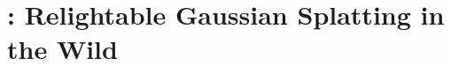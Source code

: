 \chapter{\lumigauss: Relightable Gaussian Splatting in the Wild}
\newcommand{\lumigaussdirname}{5_lumigauss}
\newcommand{\lumigaussassets}{assets/\lumigaussdirname/}

\label{chap:lumigauss}

\lumigaussteaserfigure

% 

% 
% 
% 
% 
% 



